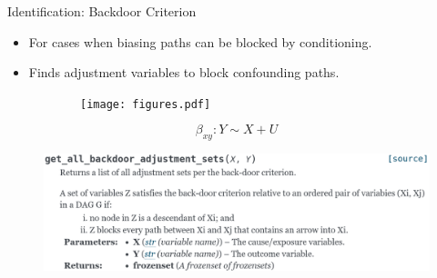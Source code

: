 \documentclass{beamer}
\begin{document}
\begin{frame}{Identification: Backdoor Criterion}
	\begin{itemize}
		\item For cases when biasing paths can be blocked by conditioning.
		\item Finds adjustment variables to block confounding paths.
	\end{itemize}
	\begin{figure}
		\begin{subfigure}{0.5\textwidth}
			\centering
			\texttt{[image: figures.pdf]}
		\end{subfigure}%
		\begin{subfigure}{0.5 \textwidth}
			\begin{equation*}
				\beta_{xy}: Y \sim X + U
			\end{equation*}
		\end{subfigure}
	\end{figure}

	\begin{figure}
		\centering
		\includegraphics[scale=0.25]{imgs/backdoor.png}
	\end{figure}

\end{frame}
\end{document}

